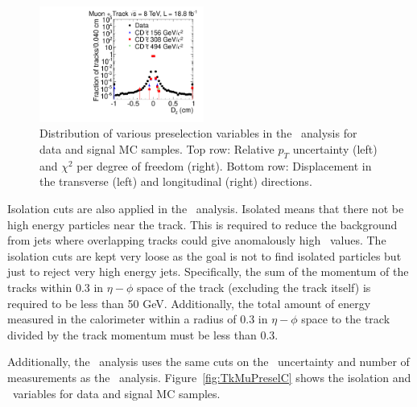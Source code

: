 \begin{figure}
  \includegraphics[clip=false, trim=0.0cm 0cm 0.0cm 0cm, width=0.48\textwidth]{figures/tkmu/Selection_Comp_8TeV_GMStau_Dz_BS}
  \caption[Distribution of relative \pt\ uncertainty, $\chi^2$ per degree of freedom, and transverse and longitudinal
displacement in the \tktof\ analysis for data and signal MC samples.]
{Distribution of various preselection variables in the \tktof\ analysis for data and signal MC samples.
Top row: Relative $p_T$ uncertainty (left) and $\chi^2$ per degree of freedom (right).
Bottom row: Displacement in the transverse (left) and longitudinal (right) directions.}
    \label{fig:TkMuPreselB}
\end{figure}

Isolation cuts are also applied in the \tktof\ analysis. Isolated means that there not be high energy particles near the track.
This is required to reduce the background from jets where overlapping tracks could give
anomalously high \dedx\ values. The isolation cuts are kept very loose as the goal is not to find isolated particles but just to reject very high energy jets.
Specifically, the sum of the momentum of the tracks within 0.3 in $\eta-\phi$ 
space of the track (excluding the track itself) is required to be less than 50 GeV. Additionally, the total
amount of energy measured in the calorimeter within a radius of 0.3 in $\eta-\phi$ space to the track divided by the track momentum must be less than 0.3.

Additionally, the \tktof\ analysis uses the same cuts on the \invbeta\ uncertainty and number of measurements as the \muononly\ analysis.
Figure~\ref{fig:TkMuPreselC} shows the isolation and \invbeta\ variables for data and signal MC samples.

